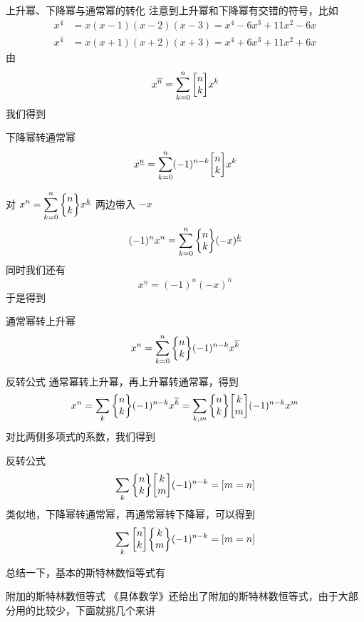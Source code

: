 \documentclass[UTF8]{beamer}
\begin{document}
    \begin{frame}{上升幂、下降幂与通常幂的转化}
        注意到上升幂和下降幂有交错的符号，比如
        $$
        \begin{aligned}
        x^{\underline 4} &= x(x-1)(x-2)(x-3) = x^4-6x^3+11x^2-6x\\
        x^{\overline 4} &= x(x+1)(x+2)(x+3) = x^4+6x^3+11x^2+6x
        \end{aligned}
        $$
        由
        $$
        x^{\overline n} = \sum_{k=0}^n \st{n}k x^{k}
        $$
        我们得到
        \begin{block}{下降幂转通常幂}
        $$
        x^{\underline n} = \sum_{k=0}^n(-1)^{n-k}\st{n}k x^{k}
        $$
        \end{block}
    \end{frame}
    \begin{frame}
        对 $\displaystyle x^n = \sum_{k=0}^n \St{n}k x^{\underline k}$
        两边带入 $-x$
        $$
        (-1)^nx^n = \sum_{k=0}^n \St{n}k (-x)^{\underline k}
        $$
        同时我们还有
        $$
        x^{\underline n} =(-1)^n(-x)^{\overline n}
        $$
        于是得到
        \begin{block}{通常幂转上升幂}
            $$
            x^n=\sum_{k=0}^n\St nk(-1)^{n-k}x^{\overline k}
            $$
        \end{block}
    \end{frame}

    \begin{frame}{反转公式}
        通常幂转上升幂，再上升幂转通常幂，得到
        $$
        x^n=\sum_{k}\St nk(-1)^{n-k}x^{\overline k} = \sum_{k,m} \St nk \st km (-1)^{n-k}x^m
        $$
        对比两侧多项式的系数，我们得到
        \begin{block}{反转公式}
            \vspace{-0.5em}
            $$
            \sum_{k} \St nk \st km (-1)^{n-k}=[m=n]
            $$
            类似地，下降幂转通常幂，再通常幂转下降幂，可以得到
            $$
            \sum_{k} \st nk \St km (-1)^{n-k}=[m=n]
            $$
            \vspace{-1em}
        \end{block}
    \end{frame}

    \begin{frame}
        总结一下，基本的斯特林数恒等式有
    \end{frame}

    \begin{frame}{附加的斯特林数恒等式}
        《具体数学》还给出了附加的斯特林数恒等式，由于大部分用的比较少，下面就挑几个来讲
        
        \begin{center}
        \end{center}
    \end{frame}
\end{document}
